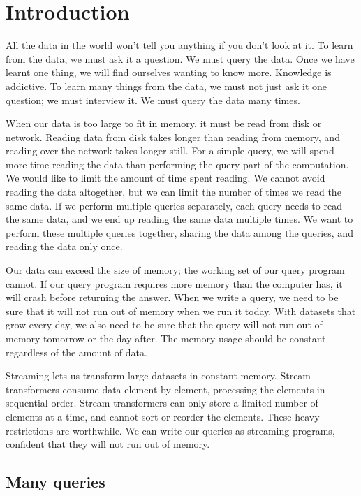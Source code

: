 \chapter{Introduction}
\label{chapter:introduction}

All the data in the world won't tell you anything if you don't look at it.
To learn from the data, we must ask it a question.
We must query the data.
Once we have learnt one thing, we will find ourselves wanting to know more.
Knowledge is addictive.
To learn many things from the data, we must not just ask it one question; we must interview it.
We must query the data many times.

When our data is too large to fit in memory, it must be read from disk or network.
Reading data from disk takes longer than reading from memory, and reading over the network takes longer still.
For a simple query, we will spend more time reading the data than performing the query part of the computation.
We would like to limit the amount of time spent reading.
We cannot avoid reading the data altogether, but we can limit the number of times we read the same data.
If we perform multiple queries separately, each query needs to read the same data, and we end up reading the same data multiple times.
We want to perform these multiple queries together, sharing the data among the queries, and reading the data only once.

Our data can exceed the size of memory; the working set of our query program cannot.
If our query program requires more memory than the computer has, it will crash before returning the answer.
When we write a query, we need to be sure that it will not run out of memory when we run it today.
With datasets that grow every day, we also need to be sure that the query will not run out of memory tomorrow or the day after.
The memory usage should be constant regardless of the amount of data.

Streaming lets us transform large datasets in constant memory.
Stream transformers consume data element by element, processing the elements in sequential order.
Stream transformers can only store a limited number of elements at a time, and cannot sort or reorder the elements.
These heavy restrictions are worthwhile.
We can write our queries as streaming programs, confident that they will not run out of memory.

\section{Many queries}

